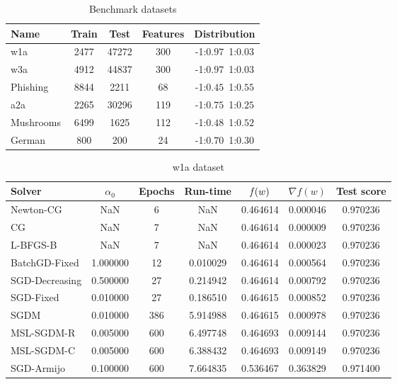 \begin{table}
\centering
\caption{Benchmark datasets}
\label{tab:datasets}
\begin{tabular}{lSSSc}
\toprule
Name & {Train} & {Test} & {Features} & {Distribution} \\
\midrule
w1a & 2477 & 47272 & 300 & -1:$0.97$\,\,\,1:$0.03$ \\
w3a & 4912 & 44837 & 300 & -1:$0.97$\,\,\,1:$0.03$ \\
Phishing & 8844 & 2211 & 68 & -1:$0.45$\,\,\,1:$0.55$ \\
a2a & 2265 & 30296 & 119 & -1:$0.75$\,\,\,1:$0.25$ \\
Mushrooms & 6499 & 1625 & 112 & -1:$0.48$\,\,\,1:$0.52$ \\
German & 800 & 200 & 24 & -1:$0.70$\,\,\,1:$0.30$ \\
\bottomrule
\end{tabular}
\end{table}

\begin{table}
\centering
\caption{w1a dataset}
\label{tab:w1a-table}
\begin{tabular}{lS[round-precision=3]S[drop-zero-decimal]S[round-precision=4]S[round-precision=6]S[exponent-mode=scientific]S[round-precision=6]}
\toprule
Solver & {$\alpha_0$} & {Epochs} & {Run-time} & {$\operatorname*{\mathit{f}}(w)$} & {$\nabla f(w)$} & {Test score} \\
\midrule
Newton-CG & NaN & 6 & NaN & 0.464614 & 0.000046 & 0.970236 \\
CG & NaN & 7 & NaN & 0.464614 & 0.000009 & 0.970236 \\
L-BFGS-B & NaN & 7 & NaN & 0.464614 & 0.000023 & 0.970236 \\
BatchGD-Fixed & 1.000000 & 12 & 0.010029 & 0.464614 & 0.000564 & 0.970236 \\
SGD-Decreasing & 0.500000 & 27 & 0.214942 & 0.464614 & 0.000792 & 0.970236 \\
SGD-Fixed & 0.010000 & 27 & 0.186510 & 0.464615 & 0.000852 & 0.970236 \\
SGDM & 0.010000 & 386 & 5.914988 & 0.464615 & 0.000978 & 0.970236 \\
MSL-SGDM-R & 0.005000 & 600 & 6.497748 & 0.464693 & 0.009144 & 0.970236 \\
MSL-SGDM-C & 0.005000 & 600 & 6.388432 & 0.464693 & 0.009149 & 0.970236 \\
SGD-Armijo & 0.100000 & 600 & 7.664835 & 0.536467 & 0.363829 & 0.971400 \\
\bottomrule
\end{tabular}
\end{table}


